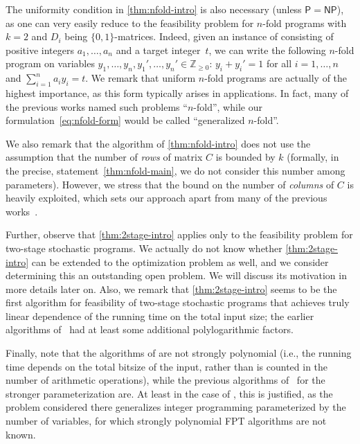 \documentclass{theoretics}
\renewcommand{\geq}{\geqslant}
\newcommand{\Z}{\mathbb{Z}}
\newcommand{\Zn}{\Z_{\geq 0}}
\begin{document}
The uniformity condition in \cref{thm:nfold-intro} is also necessary (unless $\mathsf{P}=\mathsf{NP}$), as one can very easily reduce {} to the feasibility problem for $n$-fold programs with $k=2$ and $D_i$ being $\{0,1\}$-matrices. Indeed, given an instance of {} consisting of positive integers $a_1,\ldots,a_n$ and a target integer~$t$, we can write the following $n$-fold program on variables $y_1,\ldots,y_n,y_1',\ldots,y_n'\in \Zn$: $y_i+y_i'=1$ for all $i=1,\ldots,n$ and $\sum_{i=1}^n a_i y_i=t$. We remark that uniform $n$-fold programs are actually of the highest importance, as this form typically arises in applications. In fact, many of the previous works named such problems ``$n$-fold'', while our formulation~\cref{eq:nfold-form} would be called ``generalized $n$-fold''.

We also remark that the algorithm of \cref{thm:nfold-intro} does not use the assumption that the number of {\em{rows}} of matrix $C$ is bounded by $k$ (formally, in the precise, statement~\cref{thm:nfold-main}, we do not consider this number among parameters). However, we stress that the bound on the number of {\em{columns}} of $C$ is heavily exploited, which sets our approach apart from many of the previous works~\cite{CslovjecsekEHRW21,EisenbrandHK18,KouteckyLO18}.

Further, observe that \cref{thm:2stage-intro} applies only to the feasibility problem for two-stage stochastic programs. We actually do not know whether \cref{thm:2stage-intro} can be extended to the optimization problem as well, and we consider determining this an outstanding open problem. We will discuss its motivation in more details later on. Also, we remark that \cref{thm:2stage-intro} seems to be the first algorithm for feasibility of two-stage stochastic programs that achieves truly linear dependence of the running time on the total input size; the earlier algorithms of~\cite{CslovjecsekEPVW21,KouteckyLO18} had at least some additional polylogarithmic factors.

Finally, note that the algorithms of  are not strongly polynomial (i.e., the running time depends on the total bitsize of the input, rather than is counted in the number of arithmetic operations), while the previous algorithms of~\cite{CslovjecsekEHRW21,CslovjecsekEPVW21,EisenbrandHK18,KouteckyLO18} for the stronger parameterization are. At least in the case of , this is justified, as the problem considered there generalizes integer programming parameterized by the number of variables, for which strongly polynomial FPT algorithms are not known.
\end{document}
